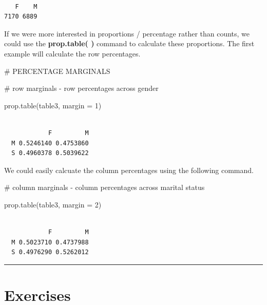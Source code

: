 \documentclass[
  letterpaper,
  DIV=11,
  numbers=noendperiod]{scrreprt}
\newenvironment{Shaded}{\begin{snugshade}}{\end{snugshade}}
\newcommand{\AttributeTok}[1]{\textcolor[rgb]{0.40,0.45,0.13}{#1}}
\newcommand{\CommentTok}[1]{\textcolor[rgb]{0.37,0.37,0.37}{#1}}
\newcommand{\DecValTok}[1]{\textcolor[rgb]{0.68,0.00,0.00}{#1}}
\newcommand{\FunctionTok}[1]{\textcolor[rgb]{0.28,0.35,0.67}{#1}}
\newcommand{\NormalTok}[1]{\textcolor[rgb]{0.00,0.23,0.31}{#1}}
\begin{document}
\begin{verbatim}

   F    M 
7170 6889 
\end{verbatim}

If we were more interested in proportions / percentage rather than
counts, we could use the \textbf{prop.table( )} command to calculate
these proportions. The first example will calculate the row percentages.

\begin{Shaded}
\begin{Highlighting}[]
\CommentTok{\# PERCENTAGE MARGINALS}

\CommentTok{\# row marginals {-} row percentages across gender}

\FunctionTok{prop.table}\NormalTok{(table3, }\AttributeTok{margin =} \DecValTok{1}\NormalTok{)}
\end{Highlighting}
\end{Shaded}

\begin{verbatim}
   
            F         M
  M 0.5246140 0.4753860
  S 0.4960378 0.5039622
\end{verbatim}

We could easily calcuate the column percentages using the following
command.

\begin{Shaded}
\begin{Highlighting}[]
\CommentTok{\# column marginals {-} column percentages across marital status}

\FunctionTok{prop.table}\NormalTok{(table3, }\AttributeTok{margin =} \DecValTok{2}\NormalTok{)}
\end{Highlighting}
\end{Shaded}

\begin{verbatim}
   
            F         M
  M 0.5023710 0.4737988
  S 0.4976290 0.5262012
\end{verbatim}

\begin{center}\rule{0.5\linewidth}{0.5pt}\end{center}

\section*{Exercises}\label{exercises-2}
\end{document}
